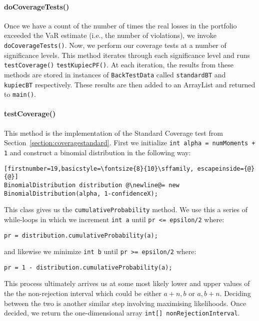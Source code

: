 \documentclass[../Dissertation.tex]{subfiles}
\begin{document}
\paragraph{doCoverageTests()}

Once we have a count of the number of times the real losses in the portfolio exceeded the VaR estimate (i.e., the number of violations), we invoke \lstinline|doCoverageTests()|.
Now, we perform our coverage tests at a number of significance levels.
This method iterates through each significance level and runs \lstinline|testCoverage()| \lstinline|testKupiecPF()|.
At each iteration, the results from these methods are stored in instances of \lstinline|BackTestData| called \lstinline|standardBT| and \lstinline|kupiecBT| respectively.
These results are then added to an ArrayList and returned to \lstinline|main()|.

\paragraph{testCoverage()}

This method is the implementation of the Standard Coverage test from Section~\ref{section:coveragestandard}.
First we initialize \lstinline|int alpha = numMoments + 1| and construct a binomial distribution in the following way:
\begin{lstlisting}[firstnumber=19,basicstyle=\fontsize{8}{10}\sffamily, escapeinside={@}{@}]
BinomialDistribution distribution @\newline@= new BinomialDistribution(alpha, 1-confidenceX);
\end{lstlisting}
This class gives us the \lstinline|cumulativeProbability| method.
We use this a series of while-loops in which we increment \lstinline|int a| until \lstinline|pr <= epsilon/2| where:
\begin{lstlisting}[firstnumber = 24]
pr = distribution.cumulativeProbability(a);
\end{lstlisting}
and likewise we minimize \lstinline|int b| until \lstinline|pr >= epsilon/2| where:
\begin{lstlisting}[firstnumber = 30]
pr = 1 - distribution.cumulativeProbability(a);
\end{lstlisting}
This process ultimately arrives us at some most likely lower and upper values of the the non-rejection interval which could be either $a+n, b$ or $a, b + n$.
Deciding between the two is another similar step involving maximising likelihoods.
Once decided, we return the one-dimensional array \lstinline|int[] nonRejectionInterval|.
\end{document}
